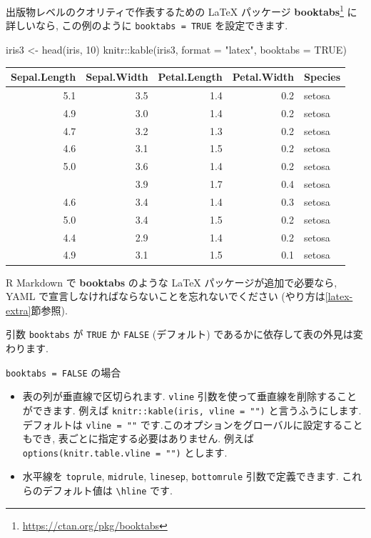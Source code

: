 \documentclass[
  11pt,
  lualatex,ja=standard,jafont=noto]{bxjsreport}
\newenvironment{Shaded}{\begin{snugshade}}{\end{snugshade}}
\newcommand{\AttributeTok}[1]{\textcolor[rgb]{0.77,0.63,0.00}{#1}}
\newcommand{\ConstantTok}[1]{\textcolor[rgb]{0.00,0.00,0.00}{#1}}
\newcommand{\DecValTok}[1]{\textcolor[rgb]{0.00,0.00,0.81}{#1}}
\newcommand{\FunctionTok}[1]{\textcolor[rgb]{0.00,0.00,0.00}{#1}}
\newcommand{\NormalTok}[1]{#1}
\newcommand{\OtherTok}[1]{\textcolor[rgb]{0.56,0.35,0.01}{#1}}
\newcommand{\SpecialCharTok}[1]{\textcolor[rgb]{0.00,0.00,0.00}{#1}}
\newcommand{\StringTok}[1]{\textcolor[rgb]{0.31,0.60,0.02}{#1}}
\providecommand{\tightlist}{%
  \setlength{\itemsep}{0pt}\setlength{\parskip}{0pt}}
\renewcommand{\href}[2]{#2\footnote{\url{#1}}}
\begin{document}
出版物レベルのクオリティで作表するための LaTeX パッケージ \href{https://ctan.org/pkg/booktabs}{\textbf{booktabs}} に詳しいなら, この例のように \texttt{booktabs = TRUE} を設定できます.

\begin{Shaded}
\begin{Highlighting}[numbers=left,,]
\NormalTok{iris3 }\OtherTok{\textless{}{-}} \FunctionTok{head}\NormalTok{(iris, }\DecValTok{10}\NormalTok{)}
\NormalTok{knitr}\SpecialCharTok{::}\FunctionTok{kable}\NormalTok{(iris3, }\AttributeTok{format =} \StringTok{"latex"}\NormalTok{, }\AttributeTok{booktabs =} \ConstantTok{TRUE}\NormalTok{)}
\end{Highlighting}
\end{Shaded}

\begin{tabular}{rrrrl}
\toprule
Sepal.Length & Sepal.Width & Petal.Length & Petal.Width & Species\\
\midrule
5.1 & 3.5 & 1.4 & 0.2 & setosa\\
4.9 & 3.0 & 1.4 & 0.2 & setosa\\
4.7 & 3.2 & 1.3 & 0.2 & setosa\\
4.6 & 3.1 & 1.5 & 0.2 & setosa\\
5.0 & 3.6 & 1.4 & 0.2 & setosa\\
\addlinespace
5.4 & 3.9 & 1.7 & 0.4 & setosa\\
4.6 & 3.4 & 1.4 & 0.3 & setosa\\
5.0 & 3.4 & 1.5 & 0.2 & setosa\\
4.4 & 2.9 & 1.4 & 0.2 & setosa\\
4.9 & 3.1 & 1.5 & 0.1 & setosa\\
\bottomrule
\end{tabular}

R Markdown で \textbf{booktabs} のような LaTeX パッケージが追加で必要なら, YAML で宣言しなければならないことを忘れないでください (やり方は\ref{latex-extra}節参照).

引数 \texttt{booktabs} が \texttt{TRUE} か \texttt{FALSE} (デフォルト) であるかに依存して表の外見は変わります.

\texttt{booktabs = FALSE} の場合

\begin{itemize}
\tightlist
\item
  表の列が垂直線で区切られます. \texttt{vline} 引数を使って垂直線を削除することができます. 例えば \texttt{knitr::kable(iris, vline = "")} と言うふうにします. デフォルトは \texttt{vline = "\textbar{}"} です.このオプションをグローバルに設定することもでき, 表ごとに指定する必要はありません. 例えば \texttt{options(knitr.table.vline = "")} とします.
\item
  水平線を \texttt{toprule}, \texttt{midrule}, \texttt{linesep}, \texttt{bottomrule} 引数で定義できます. これらのデフォルト値は \texttt{\textbackslash{}hline} です.
\end{itemize}
\end{document}
